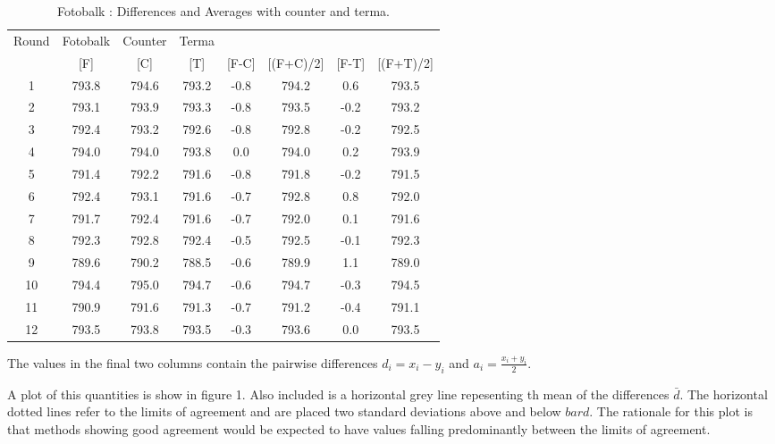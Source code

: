 \documentclass[12pt, a4paper]{report}
\theoremstyle{plain}
\theoremstyle{definition}
\theoremstyle{remark}
\begin{document}
\begin{table}[h!]
	\renewcommand\arraystretch{0.7}%
	\begin{center}
		\begin{tabular}{|c||c|c|c||c|c|c|c|}
			\hline
			Round & Fotobalk  & Counter & Terma  &   &    &   &   \\
			&  [F] & [C] & [T] &[F-C] &  [(F+C)/2] & [F-T] &  [(F+T)/2] \\
			\hline
			1 & 793.8 & 794.6 & 793.2 & -0.8 & 794.2 & 0.6 & 793.5 \\
			2 & 793.1 & 793.9 & 793.3 & -0.8 & 793.5 & -0.2 & 793.2 \\
			3 & 792.4 & 793.2 & 792.6 & -0.8 & 792.8 & -0.2 & 792.5 \\
			4 & 794.0 & 794.0 & 793.8 & 0.0 & 794.0 & 0.2 & 793.9 \\
			5 & 791.4 & 792.2 & 791.6 & -0.8 & 791.8 & -0.2 & 791.5 \\
			6 & 792.4 & 793.1 & 791.6 & -0.7 & 792.8 & 0.8 & 792.0 \\
			7 & 791.7 & 792.4 & 791.6 & -0.7 & 792.0 & 0.1 & 791.6 \\
			8 & 792.3 & 792.8 & 792.4 & -0.5 & 792.5 & -0.1 & 792.3 \\
			9 & 789.6 & 790.2 & 788.5 & -0.6 & 789.9 & 1.1 & 789.0 \\
			10 & 794.4 & 795.0 & 794.7 & -0.6 & 794.7 & -0.3 & 794.5 \\
			11 & 790.9 & 791.6 & 791.3 & -0.7 & 791.2 & -0.4 & 791.1 \\
			12 & 793.5 & 793.8 & 793.5 & -0.3 & 793.6 & 0.0 & 793.5 \\
			\hline
		\end{tabular}
		\caption{Fotobalk : Differences and Averages with counter and terma.}
		\label{GrubbsData1}
	\end{center}
\end{table}

The values in the final two columns contain the pairwise differences $d_i = x_i - y_i$ and $a_i = \frac{x_i + y_i}{2} $.


A plot of this quantities is show in figure 1. Also included is a horizontal grey line repesenting th mean of the differences $\bar{d}$. The horizontal dotted lines refer to the limits of agreement and are placed two standard deviations above and below $bar{d}$. The rationale for this plot is that methods showing good agreement would be expected to  have values falling predominantly between the limits of agreement.
\end{document}
